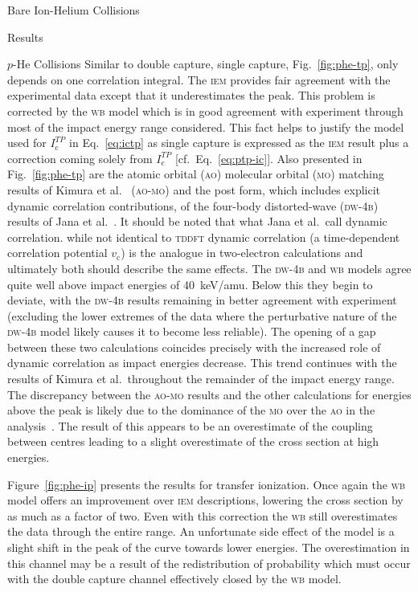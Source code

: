 \documentclass[letterpaper, 11 pt]{report}
\begin{document}
\begin{chapter}{Bare Ion-Helium Collisions \label{chap:p-he2p-he}}
\begin{section}{Results \label{sec:phe2p-res}}
\begin{subsection}{\texorpdfstring{$p$}{p}-He Collisions \label{sec:phe-res}}
         Similar to double capture, single capture, Fig.~\ref{fig:phe-tp}, only depends on one
         correlation integral. The \textsc{iem} provides fair agreement with the experimental data
         except that it underestimates the peak. This problem is corrected by the \textsc{wb} model
         which is in good agreement with experiment through most of the impact energy range considered.
         This fact helps to justify the model used for $I^{TP}_\mathrm{c}$ in Eq.~\eqref{eq:ictp} as
         single capture is expressed as the \textsc{iem} result plus a correction coming solely from
         $I^{TP}_\mathrm{c}$ [cf.\ Eq.~\eqref{eq:ptp-ic}]. Also presented in Fig.~\ref{fig:phe-tp} are
         the atomic orbital (\textsc{ao}) molecular orbital (\textsc{mo}) matching results of Kimura et
         al.~\cite{KL-86} (\textsc{ao-mo}) and the post form, which includes explicit dynamic
         correlation contributions, of the four-body distorted-wave (\textsc{dw-4b}) results of Jana et
         al.~\cite{JMP-15}. It should be noted that what Jana et al.\ call dynamic correlation. while
         not identical to \textsc{tddft} dynamic correlation (a time-dependent correlation potential
         $v_\mathrm{c}$) is the analogue in two-electron calculations and ultimately both should
         describe the same effects. The \textsc{dw-4b} and \textsc{wb} models agree quite well above
         impact energies of 40~keV/amu. Below this they begin to deviate, with the \textsc{dw-4b}
         results remaining in better agreement with experiment (excluding the lower extremes of the data
         where the perturbative nature of the \textsc{dw-4b} model likely causes it to become less
         reliable). The opening of a gap between these two calculations coincides precisely with the
         increased role of dynamic correlation as impact energies decrease. This trend continues with
         the results of Kimura et al.\ throughout the remainder of the impact energy range. The
         discrepancy between the \textsc{ao-mo} results and the other calculations for energies above
         the peak is likely due to the dominance of the \textsc{mo} over the \textsc{ao} in the
         analysis~\cite{KL-86}. The result of this appears to be an overestimate of the coupling between
         centres leading to a slight overestimate of the cross section at high energies.

         Figure~\ref{fig:phe-ip} presents the results for transfer ionization. Once again the
         \textsc{wb} model offers an improvement over \textsc{iem} descriptions, lowering the cross
         section by as much as a factor of two. Even with this correction the \textsc{wb} still
         overestimates the data through the entire range. An unfortunate side effect of the model is a
         slight shift in the peak of the curve towards lower energies. The overestimation in this
         channel may be a result of the redistribution of probability which must occur with the double
         capture channel effectively closed by the \textsc{wb} model.


\end{subsection}
\end{section}
\end{chapter}
\end{document}
